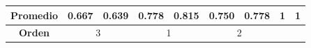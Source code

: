 \begin{table}[h]
{\begin{tabular}{|c|c|c|c|c|c|c|c|c|c|c|}
		\hline
		\multicolumn{3}{|c|}{\textbf{Promedio}} & \multicolumn{1}{r|}{0.667} & \multicolumn{1}{r|}{\cellcolor[rgb]{ 1,  1,  0}0.639} & \multicolumn{1}{r|}{0.778} & \multicolumn{1}{r|}{\cellcolor[rgb]{ 1,  1,  0}0.815} & \multicolumn{1}{r|}{0.750} & \multicolumn{1}{r|}{\cellcolor[rgb]{ 1,  1,  0}0.778} & \multicolumn{1}{r|}{1} & \multicolumn{1}{r|}{\cellcolor[rgb]{ 1,  1,  0}1} \bigstrut\\
		\hline
		\multicolumn{3}{|c|}{\textbf{Orden}} & \multicolumn{2}{c|}{3} & \multicolumn{2}{c|}{1} & \multicolumn{2}{c|}{2} & \multicolumn{2}{c|}{} \bigstrut\\
		\hline
	\end{tabular}%
	\label{tab:eval_tecnica}%
	}
\end{table}%


